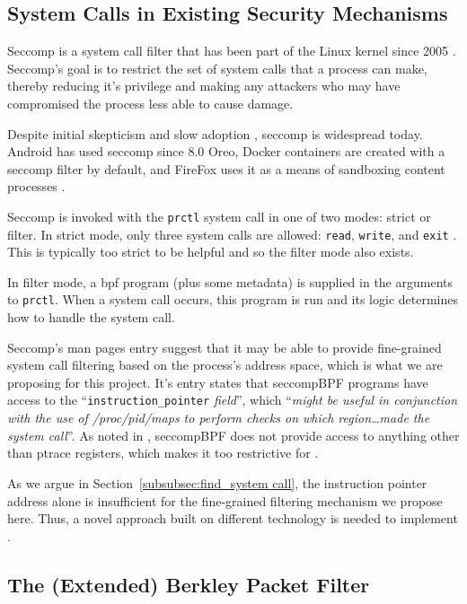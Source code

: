 \subsection{System Calls in Existing Security Mechanisms}

Seccomp is a system call filter that has been part of the Linux kernel since
2005 \cite{arcangeli_seccomp_2005}. Seccomp's goal is to restrict the set of
system calls that a process can make, thereby reducing it's privilege and making
any attackers who may have compromised the process less able to cause damage.

Despite initial skepticism and slow adoption
\cite{TORVALDS_ANYONE_USES_SECCOMP}, seccomp is widespread today. Android has
used seccomp since 8.0 Oreo, Docker containers are
created with a seccomp filter by default, and FireFox uses it as a means of
sandboxing content processes \cite{android_seccomp_oreo, docker_seccomp,
firefox_seccomp}.

Seccomp is invoked with the \texttt{prctl} system call in one of two modes: strict
or filter. In strict mode, only three system calls are allowed: \texttt{read},
\texttt{write}, and \texttt{exit} \cite{MAN_PAGES_SECCOMP}. This is typically
too strict to be helpful and so the filter mode also exists.

In filter mode, a \ac{bpf} program (plus some metadata) is supplied in the arguments to
\texttt{prctl}. When a system call occurs, this program is run and its logic
determines how to handle the system call. 

Seccomp's man pages entry suggest that it may be able to provide fine-grained
system call filtering based on the process's address space, which is what we
are proposing for this project. It's entry states that seccompBPF programs have
access to the ``\texttt{instruction\_pointer} \textit{field}'', which
``\textit{might be useful in conjunction with the use of /proc/pid/maps to
perform checks on which region\dots made the system call}''. As noted in
\textcite{yang2024makingsyscallprivilegeright}, seccompBPF does not provide
access to anything other than ptrace registers, which makes it too restrictive
for \af.

As we argue in Section~\ref{subsubsec:find_system call}, the instruction pointer
address alone is insufficient for the fine-grained filtering mechanism we
propose here. Thus, a novel approach built on different technology is needed
to implement \af. 

\subsection{The (Extended) Berkley Packet Filter}\label{subsec:bgd-bpf}

